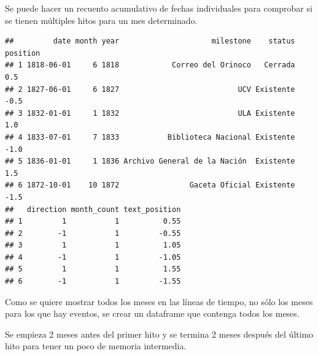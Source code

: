 \documentclass[]{article}
\newenvironment{Shaded}{\begin{snugshade}}{\end{snugshade}}
\newcommand{\DataTypeTok}[1]{\textcolor[rgb]{0.13,0.29,0.53}{#1}}
\newcommand{\FloatTok}[1]{\textcolor[rgb]{0.00,0.00,0.81}{#1}}
\newcommand{\KeywordTok}[1]{\textcolor[rgb]{0.13,0.29,0.53}{\textbf{#1}}}
\newcommand{\NormalTok}[1]{#1}
\newcommand{\OperatorTok}[1]{\textcolor[rgb]{0.81,0.36,0.00}{\textbf{#1}}}
\newcommand{\StringTok}[1]{\textcolor[rgb]{0.31,0.60,0.02}{#1}}
\begin{document}
Se puede hacer un recuento acumulativo de fechas individuales para
comprobar si se tienen múltiples hitos para un mes determinado.

\begin{Shaded}
\end{Shaded}

\begin{verbatim}
##         date month year                     milestone    status position
## 1 1818-06-01     6 1818            Correo del Orinoco   Cerrada      0.5
## 2 1827-06-01     6 1827                           UCV Existente     -0.5
## 3 1832-01-01     1 1832                           ULA Existente      1.0
## 4 1833-07-01     7 1833           Biblioteca Nacional Existente     -1.0
## 5 1836-01-01     1 1836 Archivo General de la Nación  Existente      1.5
## 6 1872-10-01    10 1872                Gaceta Oficial Existente     -1.5
##   direction month_count text_position
## 1         1           1          0.55
## 2        -1           1         -0.55
## 3         1           1          1.05
## 4        -1           1         -1.05
## 5         1           1          1.55
## 6        -1           1         -1.55
\end{verbatim}

Como se quiere mostrar todos los meses en las líneas de tiempo, no sólo
los meses para los que hay eventos, se crear un dataframe que contenga
todos los meses.

Se empieza 2 meses antes del primer hito y se termina 2 meses después
del último hito para tener un poco de memoria intermedia.
\end{document}
